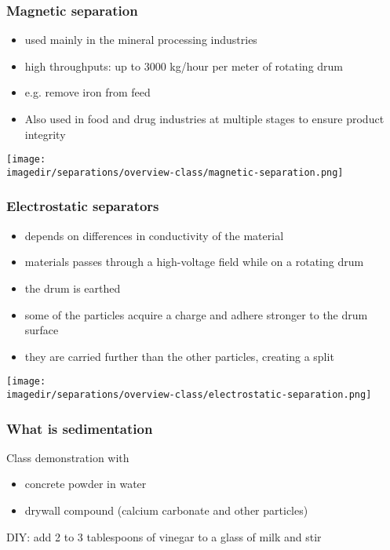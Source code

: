 \begin{frame}\frametitle{{\color{myGreen}{Quick mention:}} Magnetic separation}
	\begin{itemize}
		\item	used mainly in the mineral processing industries
		\item	high throughputs: up to 3000 kg/hour per meter of rotating drum
		\item	e.g. remove iron from feed
		\item	Also used in food and drug industries at multiple stages to ensure product integrity		
	\end{itemize}
	
	\begin{center}
		\texttt{[image: \\imagedir/separations/overview-class/magnetic-separation.png]}
	\end{center}
\end{frame}

\begin{frame}\frametitle{{\color{myGreen}{Quick mention:}} Electrostatic separators}
	
	\begin{itemize}
		\item	depends on differences in conductivity of the material
		\item	materials passes through a high-voltage field while on a rotating drum
		\item	the drum is earthed
		\item	some of the particles acquire a charge and adhere stronger to the drum surface
		\item	they are carried further than the other particles, creating a split
	\end{itemize}
	
	\begin{center}
		\texttt{[image: \\imagedir/separations/overview-class/electrostatic-separation.png]}
	\end{center}
\end{frame}

\begin{frame}\frametitle{What is sedimentation}
	Class demonstration with
	\begin{itemize}
		\item	concrete powder in water
		\item	drywall compound (calcium carbonate and other particles)
	\end{itemize}

	\vspace{12pt}
	DIY: add 2 to 3 tablespoons of vinegar to a glass of milk and stir	
\end{frame}

